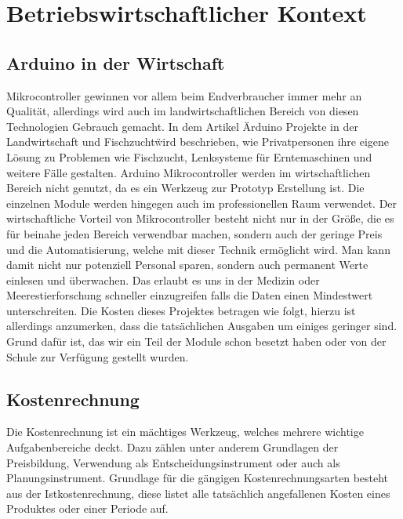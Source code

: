 \newpage
\chapter{Betriebswirtschaftlicher Kontext}


\def \currentAuthor {Kevin Glatz}

                                                                        
\section{Arduino in der Wirtschaft}
Mikrocontroller gewinnen vor allem beim Endverbraucher immer mehr an Qualität, allerdings wird auch im landwirtschaftlichen Bereich von diesen Technologien Gebrauch gemacht. In dem Artikel \"Arduino Projekte in der Landwirtschaft und Fischzucht\" wird beschrieben, wie Privatpersonen ihre eigene Lösung zu Problemen wie Fischzucht, Lenksysteme für Erntemaschinen und weitere Fälle gestalten.
Arduino Mikrocontroller werden im wirtschaftlichen Bereich nicht genutzt, da es ein Werkzeug zur Prototyp Erstellung ist. Die einzelnen Module werden hingegen auch im professionellen Raum verwendet.  Der wirtschaftliche Vorteil von Mikrocontroller besteht nicht nur in der Größe, die es für beinahe jeden Bereich verwendbar machen, sondern auch der geringe Preis und die Automatisierung, welche mit dieser Technik ermöglicht wird. Man kann damit nicht nur potenziell Personal sparen, sondern auch permanent Werte einlesen und überwachen. Das erlaubt es uns in der Medizin oder Meerestierforschung schneller einzugreifen falls die Daten einen Mindestwert unterschreiten. Die Kosten dieses Projektes betragen wie folgt, hierzu ist allerdings anzumerken, dass die tatsächlichen Ausgaben um einiges geringer sind. Grund dafür ist, das wir ein Teil der Module schon besetzt haben oder von der Schule zur Verfügung gestellt wurden.



\section{Kostenrechnung}

Die Kostenrechnung ist ein mächtiges Werkzeug, welches mehrere wichtige Aufgabenbereiche deckt. Dazu zählen unter anderem Grundlagen der Preisbildung, Verwendung als Entscheidungsinstrument oder auch als Planungsinstrument. Grundlage für die gängigen Kostenrechnungsarten besteht aus der Istkostenrechnung, diese listet alle tatsächlich angefallenen Kosten eines Produktes oder einer Periode auf. \cite{KORE}

